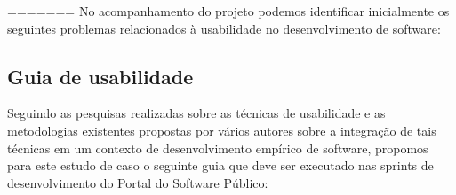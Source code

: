 =======
No acompanhamento do projeto podemos identificar inicialmente os seguintes problemas relacionados à usabilidade no desenvolvimento de software:



\subsection{Guia de usabilidade}

	Seguindo as pesquisas realizadas sobre as técnicas de usabilidade e as metodologias existentes propostas por vários autores sobre a integração de tais técnicas em um contexto de desenvolvimento empírico de software, propomos  para este estudo de caso o seguinte guia que deve ser executado nas sprints de desenvolvimento do Portal do Software Público:
	
